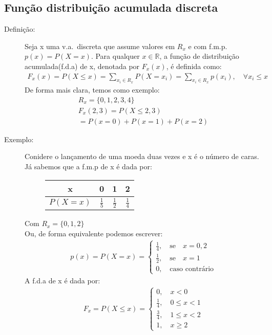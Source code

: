    \subsection{Função distribuição acumulada discreta}
   \begin{description}
     \item [Definição:] Seja x uma v.a.\ discreta que assume valores em $R_{x}$ e com f.m.p.\
       $p(x)=P(X=x)$. Para qualquer $x \in \mathbb{R}$, a função de distribuição 
       acumulada(f.d.a) de x, denotada por $F_{x}(x)$, é definida como: 
       \begin{align}
         F_{x}(x)=P(X \leq x )= \sum \limits_{x_{i} \in R_{x}} P(X=x_i) = \sum_{x_{i} \in R_{x}} p(x_i) , \quad        \forall x_i \le x \nonumber
       \end{align}
       De forma mais clara, temos como exemplo: 
       \begin{align*}
         R_{x}= \{0,1,2,3,4 \}\\
         F_{x}(2,3)= P(X\le 2,3)\\
         = P(x=0)+P(x=1)+P(x=2)
       \end{align*}
     \item [Exemplo:]
       Conidere o lançamento de uma moeda duas vezes e x é o número de caras. Já sabemos
       que a f.m.p de x é dada por:
       \begin{figure} [H]
         \centering
         \begin{tabular}{c c c c}
           \toprule
           x&0&1&2\\ \midrule
           $P(X=x)$&$\frac{1}{5}$&$\frac{1}{2}$&$\frac{1}{4}$\\ \bottomrule
         \end{tabular}
         \label{tab:5}
       \end{figure}
       Com $R_{x}=\{0,1,2\}$\\
       Ou, de forma equivalente podemos escrever: 
       \begin{align*}
         p(x)=P(X=x)=
         \begin{cases}
           \frac{1}{4}, \quad \text{se} \quad x=0,2\\
           \frac{1}{2}, \quad \text{se} \quad x=1\\
           0,\quad  \text{caso contrário}
         \end{cases}
       \end{align*}
       A f.d.a de x é dada por:
       \begin{align*}
         F_{x}=P(X\le x)= 
         \begin{cases}
           0,\quad  x<0 \\
           \frac{1}{4}, \quad 0 \le x <1\\
           \frac{3}{4}, \quad 1 \le x < 2\\
           1, \quad x \geq 2
         \end{cases}
       \end{align*}


\end{description}
